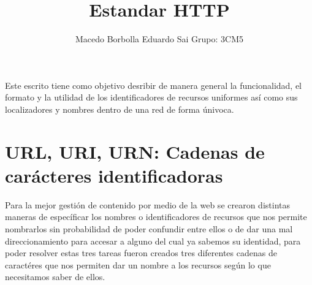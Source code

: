 \documentclass[12pt]{article}
\title{Estandar HTTP}
\author{Macedo Borbolla Eduardo Sai \inst{1}Grupo: 3CM5 }
\begin{document}
 

\maketitle

\begin{resumo}
 Este escrito tiene como objetivo desribir de manera general la funcionalidad, el formato  y la utilidad de los identificadores de recursos uniformes así como sus localizadores
 y nombres dentro de una red de forma únivoca. 
\end{resumo}


\section{ URL, URI, URN: Cadenas de carácteres identificadoras}

Para la mejor gestión de contenido por medio de la web se crearon distintas maneras de específicar los nombres o identificadores de recursos que nos permite nombrarlos sin
probabilidad de poder confundir entre ellos o de dar una mal direccionamiento para accesar a alguno del cual ya sabemos su identidad, para poder resolver estas tres tareas
fueron creados tres diferentes cadenas de caractéres que nos permiten dar un nombre a los recursos según lo que necesitamos saber de ellos.
\end{document}
